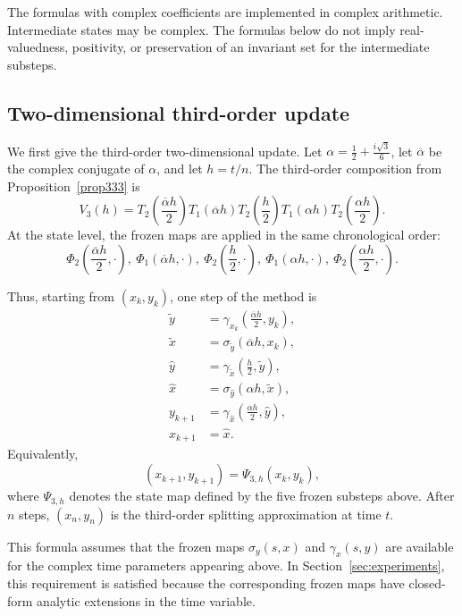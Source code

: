 \documentclass[preprint,1p,times,nopreprintline]{elsarticle}
\begin{document}
The formulas with complex coefficients are implemented in complex arithmetic. Intermediate states may be complex. The formulas below do not imply real-valuedness, positivity, or preservation of an invariant set for the intermediate substeps.

\subsection{Two-dimensional third-order update}

We first give the third-order two-dimensional update. Let $\alpha=\frac{1}{2}+\frac{i\sqrt{3}}{6}$, let $\overline{\alpha}$ be the complex conjugate of $\alpha$, and let $h=t/n$. The third-order composition from Proposition~\ref{prop333} is
\[
V_3(h)
=
T_2\!\left(\frac{\overline{\alpha}h}{2}\right)
T_1(\overline{\alpha}h)
T_2\!\left(\frac{h}{2}\right)
T_1(\alpha h)
T_2\!\left(\frac{\alpha h}{2}\right).
\]
At the state level, the frozen maps are applied in the same chronological order:
\[
\Phi_2\!\left(\frac{\overline{\alpha}h}{2},\cdot\right),
~
\Phi_1(\overline{\alpha}h,\cdot),
~
\Phi_2\!\left(\frac{h}{2},\cdot\right),
~
\Phi_1(\alpha h,\cdot),
~
\Phi_2\!\left(\frac{\alpha h}{2},\cdot\right).
\]

Thus, starting from $(x_k,y_k)$, one step of the method is
\begin{align*}
\widetilde{y}
&=
\gamma_{x_k}\!\left(\frac{\overline{\alpha}h}{2},y_k\right),\\
\widetilde{x}
&=
\sigma_{\widetilde{y}}(\overline{\alpha}h,x_k),\\
\widehat{y}
&=
\gamma_{\widetilde{x}}\!\left(\frac{h}{2},\widetilde{y}\right),\\
\widehat{x}
&=
\sigma_{\widehat{y}}(\alpha h,\widetilde{x}),\\
y_{k+1}
&=
\gamma_{\widehat{x}}\!\left(\frac{\alpha h}{2},\widehat{y}\right),\\
x_{k+1}
&=
\widehat{x}.
\end{align*}
Equivalently,
\[
(x_{k+1},y_{k+1})
=
\Psi_{3,h}(x_k,y_k),
\]
where $\Psi_{3,h}$ denotes the state map defined by the five frozen substeps above. After $n$ steps, $(x_n,y_n)$ is the third-order splitting approximation at time $t$.

This formula assumes that the frozen maps $\sigma_y(s,x)$ and $\gamma_x(s,y)$ are available for the complex time parameters appearing above. In Section~\ref{sec:experiments}, this requirement is satisfied because the corresponding frozen maps have closed-form analytic extensions in the time variable.
\end{document}
